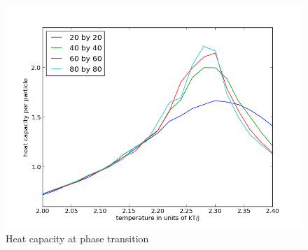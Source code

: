 \documentclass[a4paper,english, 10pt, twoside]{article}
\begin{document}
  \begin{figure}[H]
  \centering
 \includegraphics[scale=0.5]{heat_capacity.png}
 \caption{Heat capacity at phase transition}
\label{heat_capacity}
 \end{figure} 
\end{document}
